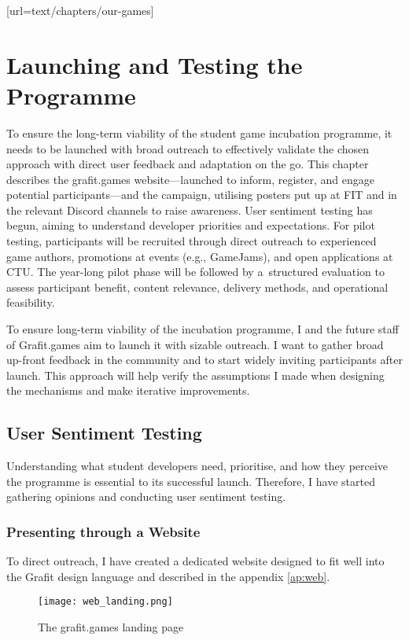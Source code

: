 [url=text/chapters/our-games]
\chapter{Launching and Testing the Programme}\label{chap:launch-testing}

\begin{chapterabstract}
	To ensure the long-term viability of the student game incubation programme, it needs to be launched with broad outreach to effectively validate the chosen approach with direct user feedback and adaptation on the go. This chapter describes the grafit.games website—launched to inform, register, and engage potential participants—and the campaign, utilising posters put up at FIT and in the relevant Discord channels to raise awareness. User sentiment testing has begun, aiming to understand developer priorities and expectations. For pilot testing, participants will be recruited through direct outreach to experienced game authors, promotions at events (e.g., GameJams), and open applications at CTU. The year-long pilot phase will be followed by a~structured evaluation to assess participant benefit, content relevance, delivery methods, and operational feasibility.
\end{chapterabstract}

To ensure long-term viability of the incubation programme, I and the future staff of Grafit.games aim to launch it with sizable outreach. I want to gather broad up-front feedback in the community and to start widely inviting participants after launch. This approach will help verify the assumptions I made when designing the mechanisms and make iterative improvements.

\section{User Sentiment Testing}
Understanding what student developers need, prioritise, and how they perceive the programme is essential to its successful launch. Therefore, I have started gathering opinions and conducting user sentiment testing.

\subsection{Presenting through a Website}
To direct outreach, I have created a dedicated website designed to fit well into the Grafit design language and described in the appendix \ref{ap:web}.
\begin{figure}[H]
    \texttt{[image: web\_landing.png]}
    \caption{The grafit.games landing page}
    \label{fig:web_landing}
\end{figure}

